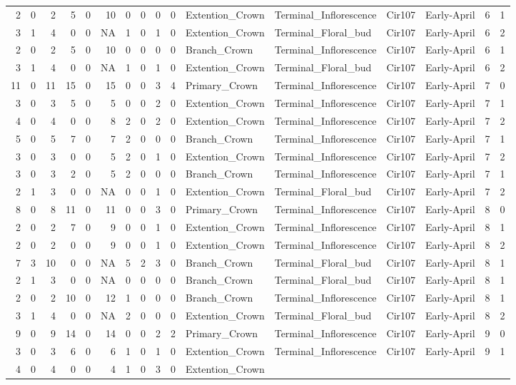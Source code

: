 \documentclass[]{article}
\begin{document}
\begin{longtable}[]{@{}rrrrrrrrrrllllrl@{}}
2 & 0 & 2 & 5 & 0 & 10 & 0 & 0 & 0 & 0 & Extention\_Crown &
Terminal\_Inflorescence & Cir107 & Early-April & 6 & 1\tabularnewline
3 & 1 & 4 & 0 & 0 & NA & 1 & 0 & 1 & 0 & Extention\_Crown &
Terminal\_Floral\_bud & Cir107 & Early-April & 6 & 2\tabularnewline
2 & 0 & 2 & 5 & 0 & 10 & 0 & 0 & 0 & 0 & Branch\_Crown &
Terminal\_Inflorescence & Cir107 & Early-April & 6 & 1\tabularnewline
3 & 1 & 4 & 0 & 0 & NA & 1 & 0 & 1 & 0 & Extention\_Crown &
Terminal\_Floral\_bud & Cir107 & Early-April & 6 & 2\tabularnewline
11 & 0 & 11 & 15 & 0 & 15 & 0 & 0 & 3 & 4 & Primary\_Crown &
Terminal\_Inflorescence & Cir107 & Early-April & 7 & 0\tabularnewline
3 & 0 & 3 & 5 & 0 & 5 & 0 & 0 & 2 & 0 & Extention\_Crown &
Terminal\_Inflorescence & Cir107 & Early-April & 7 & 1\tabularnewline
4 & 0 & 4 & 0 & 0 & 8 & 2 & 0 & 2 & 0 & Extention\_Crown &
Terminal\_Inflorescence & Cir107 & Early-April & 7 & 2\tabularnewline
5 & 0 & 5 & 7 & 0 & 7 & 2 & 0 & 0 & 0 & Branch\_Crown &
Terminal\_Inflorescence & Cir107 & Early-April & 7 & 1\tabularnewline
3 & 0 & 3 & 0 & 0 & 5 & 2 & 0 & 1 & 0 & Extention\_Crown &
Terminal\_Inflorescence & Cir107 & Early-April & 7 & 2\tabularnewline
3 & 0 & 3 & 2 & 0 & 5 & 2 & 0 & 0 & 0 & Branch\_Crown &
Terminal\_Inflorescence & Cir107 & Early-April & 7 & 1\tabularnewline
2 & 1 & 3 & 0 & 0 & NA & 0 & 0 & 1 & 0 & Extention\_Crown &
Terminal\_Floral\_bud & Cir107 & Early-April & 7 & 2\tabularnewline
8 & 0 & 8 & 11 & 0 & 11 & 0 & 0 & 3 & 0 & Primary\_Crown &
Terminal\_Inflorescence & Cir107 & Early-April & 8 & 0\tabularnewline
2 & 0 & 2 & 7 & 0 & 9 & 0 & 0 & 1 & 0 & Extention\_Crown &
Terminal\_Inflorescence & Cir107 & Early-April & 8 & 1\tabularnewline
2 & 0 & 2 & 0 & 0 & 9 & 0 & 0 & 1 & 0 & Extention\_Crown &
Terminal\_Inflorescence & Cir107 & Early-April & 8 & 2\tabularnewline
7 & 3 & 10 & 0 & 0 & NA & 5 & 2 & 3 & 0 & Branch\_Crown &
Terminal\_Floral\_bud & Cir107 & Early-April & 8 & 1\tabularnewline
2 & 1 & 3 & 0 & 0 & NA & 0 & 0 & 0 & 0 & Branch\_Crown &
Terminal\_Floral\_bud & Cir107 & Early-April & 8 & 1\tabularnewline
2 & 0 & 2 & 10 & 0 & 12 & 1 & 0 & 0 & 0 & Branch\_Crown &
Terminal\_Inflorescence & Cir107 & Early-April & 8 & 1\tabularnewline
3 & 1 & 4 & 0 & 0 & NA & 2 & 0 & 0 & 0 & Extention\_Crown &
Terminal\_Floral\_bud & Cir107 & Early-April & 8 & 2\tabularnewline
9 & 0 & 9 & 14 & 0 & 14 & 0 & 0 & 2 & 2 & Primary\_Crown &
Terminal\_Inflorescence & Cir107 & Early-April & 9 & 0\tabularnewline
3 & 0 & 3 & 6 & 0 & 6 & 1 & 0 & 1 & 0 & Extention\_Crown &
Terminal\_Inflorescence & Cir107 & Early-April & 9 & 1\tabularnewline
4 & 0 & 4 & 0 & 0 & 4 & 1 & 0 & 3 & 0 & Extention\_Crown &

\end{longtable}
\end{document}
